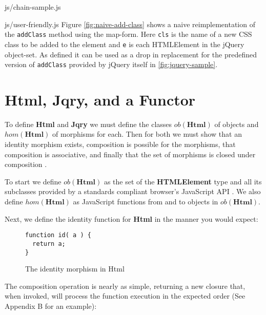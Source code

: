 \documentclass[preprint]{sigplanconf}
\begin{document}
\begin{lstinputlisting}[
    language=JavaScript,
    caption={Sources of Html objects},
    label={lst:chain-sample}
]{js/chain-sample.js}
\begin{lstinputlisting}[
    language=JavaScript,
    caption={User friendly overhead},
    label={lst:user-friendly}
]{js/user-friendly.js}
Figure \ref{fig:naive-add-class} shows a naive reimplementation of the \verb|addClass| method using the map-form. Here \verb|cls| is the name of a new CSS class to be added to the element and \verb|e| is each HTMLElement in the jQuery object-set. As defined it can be used as a drop in replacement for the predefined version of \verb|addClass| provided by jQuery itself in \ref{fig:jquery-sample}.

\section{Html, Jqry, and a Functor}

To define \textbf{Html} and \textbf{Jqry} we must define the classes \begin{math}ob(\mathbf{Html})\end{math} of objects and \begin{math}hom(\mathbf{Html})\end{math} of morphisms for each. Then for both we must show that an identity morphism exists, composition is possible for the morphisms, that composition is associative, and finally that the set of morphisms is closed under composition \cite[p. ~1]{bib:category-definition}.

To start we define \begin{math}ob(\mathbf{Html})\end{math} as the set of the \textbf{HTMLElement} type and all its subclasses provided by a standards compliant browser's JavaScript API \cite{bib:htmlelement, bib:all-htmlelements}. We also define \begin{math}hom(\mathbf{Html})\end{math} as JavaScript functions from and to objects in \begin{math}ob(\mathbf{Html})\end{math}.

Next, we define the identity function for \textbf{Html} in the manner you would expect:

\begin{figure}[!ht]
\small
\begin{verbatim}
function id( a ) {
  return a;
}
\end{verbatim}
\nocaptionrule \caption{The identity morphism in Html}
\end{figure}

The composition operation is nearly as simple, returning a new closure that, when invoked, will process the function execution in the expected order (See Appendix B for an example):


\end{lstinputlisting}
\end{lstinputlisting}
\end{document}
